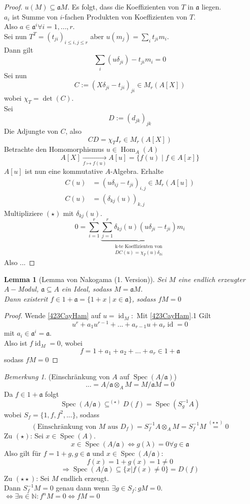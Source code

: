 \documentclass[10pt,a4paper]{article}
\newcommand{\N}{\ensuremath{\mathbb{N}}}
\newcommand{\la}{\ensuremath{\lambda}}
\newcommand{\End}{\operatorname{Hom}}
\newcommand{\Spec}{\ensuremath{\operatorname{Spec}}}
\newcommand{\id}{\operatorname{id}}
\newcounter{thm}[section]
\theoremstyle{definition}
\theoremstyle{plain}
\newtheorem{lem}[thm]{Lemma}
\theoremstyle{remark}
\newtheorem{bem}[thm]{Bemerkung}
\begin{document}
\begin{proof}
	$u(M)\subseteq\mathfrak aM$. Es folgt, dass die Koeffizienten von $T$ in $\mathfrak a$ liegen.\\
	$a_i$ ist Summe von $i$-fachen Produkten von Koeffizienten von $T$.\\
	Also $a\in\mathfrak a^i\forall i=1,...,r$.\\
	Sei nun $T^T=(t_{ji})_{i\le i,j\le r}$ aber $u(m_j)=\sum_{i}t_{ji}m_i$.\\
	Dann gilt
	\[\sum_i(u\delta_{ji})-t_{ji}m_i=0\]
	Sei nun
	\[C:=(X\delta_{ji}-t_{ji})_{ji}\in M_r(A[X])\]
	wobei $\chi_T=\det(C)$.\\
	Sei
	\[D:=(d_{jk})_{jk}\]
	Die Adjungte von $C$, also
	\[CD=\chi_TI_r\in M_r(A[X])\tag{$\star\star$}\]
	Betrachte den Homomorphismus $u\in\End_A(A)$
	\[A[X]\xrightarrow[f\mapsto f(u)]{}A[u]=\{f(u)\mid f\in A[x] \}\]
	$A[u]$ ist nun eine kommutative $A$-Algebra. Erhalte
	\begin{align*}
	C(u)&=(u\delta_{ij}-t_{ji})_{i,j}\in M_r(A[u])\\
	C(u)&=(\delta_{kj}(u))_{k,j}
	\end{align*}
	Multipliziere $(\star)$ mit $\delta_{kj}(u)$.
	\[0=\sum_{i=1}^{r}\underbrace{\sum_{j=1}^{r}\delta_{kj}(u)(u\delta_{ji}-t_{ji})}_{\substack{\text{k-te Koeffizienten von}\\DC(u)=\chi_T(u)\delta_{ki}}}m_i\]
	Also ...
\end{proof}
\begin{lem}[Lemma von Nakogama (1. Version)]
	\label{424Nakayana1}
	Sei $M$ eine endlich erzeugter $A-$Modul, $\mathfrak a\subseteq A$ ein Ideal, sodass $M=\mathfrak aM$.\\
	Dann existerit $f\in1+\mathfrak a=\{1+x\mid x\in \mathfrak a\}$, sodass $fM=0$
\end{lem}
\begin{proof}
	Wende \ref{423CayHam} auf $u=\id_M:$
	Mit \ref{423CayHam}.1 Gilt
	\[u^r+a_1u^{r-1}+...+a_{r-1}u+a_r\id=0\]
	mit $a_i\in\mathfrak a^i=\mathfrak a$.\\
	Also ist $f\id_M=0$, wobei
	\[f=1+a_1+a_2+...+a_r\in 1+\mathfrak a\]
	sodass $fM=0$
\end{proof}
\begin{bem}
	(Einschränkung von $A$ auf $\Spec(A/\mathfrak a)$)
	\[...=A/\mathfrak a\otimes_AM=M/\mathfrak aM=0\]
	Da $f\in 1+\mathfrak a$ folgt
	\[\Spec(A/\mathfrak a)\subseteq^{(\star)}D(f)=\Spec(S_{g}^{-1}A)\]
	wobei $S_f=\{1,f,f^2,...\}$, sodass
	\[(\text{Einschränkung von $M$ aus $D_f$})=S_f^{-1}A\otimes_AM=S_f^{-1}M\overset{(\star\star)}{=}0\]
	Zu $(\star)$: Sei $x\in\Spec(A)$.
	\[x\in\Spec(A/\mathfrak a)\Leftrightarrow g(\la)=0\forall g\in\mathfrak a \]
	Also gilt für $f=1+g,g\in\mathfrak a$ und $x\in\Spec(A/\mathfrak a)$:
	\[f(x)=1+g(x)=1\neq 0\]
	\[\Rightarrow \Spec(A/\mathfrak a)\subseteq \{x|f(x)\neq 0\}=D(f)\]
	Zu $(\star\star)$: Sei $M$ endlich erzeugt.\\
	Dann $S^{-1}_fM=0$ genau dann wenn $\exists g\in S_f:gM=0$.\\
	$\Leftrightarrow \exists n\in \N: f^nM=0\Leftrightarrow fM=0$
\end{bem}
\end{document}
